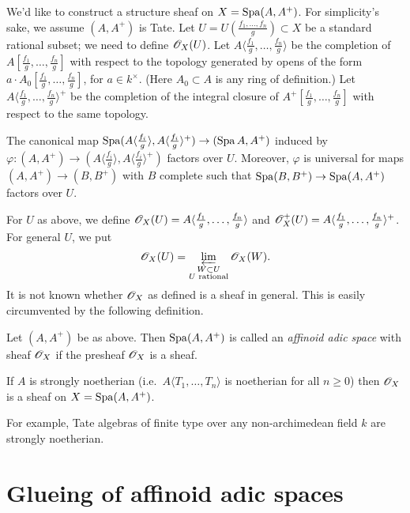 \documentclass{article}
\begin{document}
We'd like to construct a structure sheaf on $X=\operatorname{Spa}(A,A^+)$. For simplicity's 
sake, we assume $(A,A^+)$ is Tate. Let 
$U=U\left(\frac{f_1,\dots,f_n}{g}\right)\subset X$ be a standard rational 
subset; we need to define $\mathscr{O}_X(U)$. Let 
$A\langle \frac{f_1}{g},\dots,\frac{f_n}{g}\rangle$ be the completion of 
$A[\frac{f_1}{g},\dots,\frac{f_n}{g}]$ with respect to the topology generated 
by opens of the form $a\cdot A_0[\frac{f_1}{g},\dots,\frac{f_n}{g}]$, for 
$a\in k^\times$. (Here $A_0\subset A$ is any ring of definition.) 
Let $A\langle \frac{f_1}{g},\dots,\frac{f_n}{g}\rangle^+$ be the completion of 
the integral closure of $A^+[\frac{f_1}{g},\dots,\frac{f_n}{g}]$ with respect 
to the same topology. 

\begin{proposition}
The canonical map $\operatorname{Spa}(A\langle\frac{f_i}{g}\rangle,A\langle \frac{f_i}{g}\rangle^+) \to (\operatorname{Spa} A,A^+)$ induced by $\varphi:(A,A^+) \to (A\langle \frac{f_i}{g}\rangle, A\langle \frac{f_i}{g}\rangle^+)$ factors over $U$. Moreover, $\varphi$ is universal for maps 
$(A,A^+) \to (B,B^+)$ with $B$ complete such that $\operatorname{Spa}(B,B^+) \to \operatorname{Spa}(A,A^+)$ factors over $U$. 
\end{proposition}

For $U$ as above, we define 
$\mathscr{O}_X(U)=A\langle \frac{f_1}{g},\dots,\frac{f_n}{g}\rangle$ and 
$\mathscr{O}_X^+(U) = A\langle \frac{f_1}{g},\dots,\frac{f_n}{g}\rangle^+$. For general 
$U$, we put 
\[
  \mathscr{O}_X(U) = \varprojlim_{\substack{W\subset U \\ U\text{ rational}}} \mathscr{O}_X(W) .
\]
It is not known whether $\mathscr{O}_X$ as defined is a sheaf in general. This is 
easily circumvented by the following definition. 

\begin{definition}
Let $(A,A^+)$ be as above. Then $\operatorname{Spa}(A,A^+)$ is called an \emph{affinoid adic 
space} with sheaf $\mathscr{O}_X$ if the presheaf $\mathscr{O}_X$ is a sheaf. 
\end{definition}

\begin{theorem}
If $A$ is strongly noetherian (i.e.\ $A\langle T_1,\dots,T_n\rangle$ is 
noetherian for all $n\geqslant 0$) then $\mathscr{O}_X$ is a sheaf on $X=\operatorname{Spa}(A,A^+)$. 
\end{theorem}

For example, Tate algebras of finite type over any non-archimedean field $k$ 
are strongly noetherian. 





\section{Glueing of affinoid adic spaces}
\end{document}
